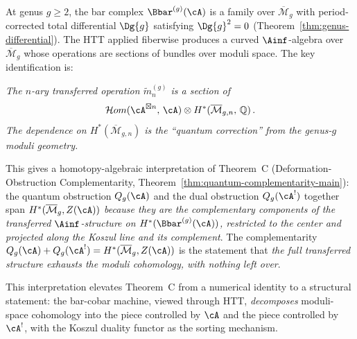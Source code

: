 \begin{remark}
\label{rem:higher-genus-htt}
At genus $g \geq 2$, the bar complex $\Bbar^{(g)}(\cA)$ is a family
over $\overline{\mathcal{M}}_g$ with period-corrected total
differential $\Dg{g}$ satisfying $\Dg{g}^2 = 0$
(Theorem~\ref{thm:genus-differential}).
The HTT applied fiberwise produces a curved $\Ainf$-algebra over
$\overline{\mathcal{M}}_g$ whose operations are sections of bundles
over moduli space. The key identification is:

\medskip
\emph{The $n$-ary transferred operation $\tilde{m}_n^{(g)}$ is a
section of
\[
\mathcal{H}om(\cA^{\boxtimes n},\, \cA) \otimes
H^*(\overline{\mathcal{M}}_{g,n},\, \mathbb{Q})\,.
\]
The dependence on $H^*(\overline{\mathcal{M}}_{g,n})$ is the
``quantum correction'' from the genus-$g$ moduli geometry.}

\medskip
\noindent
This gives a homotopy-algebraic interpretation of Theorem~C
(Deformation-Obstruction Complementarity,
Theorem~\ref{thm:quantum-complementarity-main}):
the quantum obstruction $Q_g(\cA)$ and the dual obstruction
$Q_g(\cA^!)$ together span $H^*(\overline{\mathcal{M}}_g, Z(\cA))$
\emph{because they are the complementary components of the
transferred $\Ainf$-structure on $H^*(\Bbar^{(g)}(\cA))$, restricted
to the center and projected along the Koszul line and its complement}.
The complementarity $Q_g(\cA) + Q_g(\cA^!) =
H^*(\overline{\mathcal{M}}_g, Z(\cA))$ is the statement that
\emph{the full transferred structure exhausts the moduli
cohomology, with nothing left over}.

This interpretation elevates Theorem~C from a numerical identity to a
structural statement: the bar-cobar machine, viewed through HTT,
\emph{decomposes} moduli-space cohomology into the piece
controlled by $\cA$ and the piece controlled by $\cA^!$, with the
Koszul duality functor as the sorting mechanism.
\end{remark}

